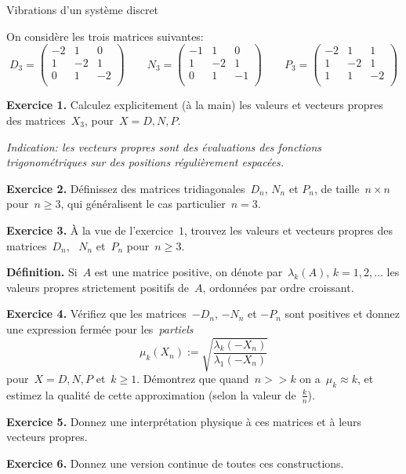 \documentclass[a4paper,11pt]{article}
\begin{document}
\thispagestyle{empty}

\begin{center}
	\Large Vibrations d'un système discret
\end{center}

On considère les trois matrices suivantes:
\[
	D_3=\begin{pmatrix}
		-2 & 1 & 0 \\
		1 & -2 & 1 \\
		0 & 1 & -2 \\
	\end{pmatrix}
	\qquad
	N_3=\begin{pmatrix}
		-1 & 1 & 0 \\
		1 & -2 & 1 \\
		0 & 1 & -1 \\
	\end{pmatrix}
	\qquad
	P_3=\begin{pmatrix}
		-2 & 1 & 1 \\
		1 & -2 & 1 \\
		1 & 1 & -2 \\
	\end{pmatrix}
\]

{\bf Exercice 1.}
Calculez explicitement (à la main) les valeurs et vecteurs propres des
matrices~$X_3$, pour~$X=D,N,P$.

{\sl Indication: les vecteurs propres sont des évaluations des fonctions
trigonométriques sur des positions régulièrement espacées.}

{\bf Exercice 2.}
Définissez des matrices tridiagonales~$D_n$, $N_n$ et $P_n$, de taille~$n\times
n$ pour~$n\ge 3$, qui généralisent le cas particulier~$n=3$.

{\bf Exercice 3.}
À la vue de l'exercice~$1$, trouvez les valeurs et vecteurs propres des
matrices~$D_n$, ~$N_n$ et~$P_n$ pour~$n\ge 3$.

{\bf Définition.}
Si~$A$ est une matrice positive, on dénote par~$\lambda_k(A)$, $k=1,2,\ldots$
les valeurs propres strictement positifs de~$A$, ordonnées par ordre croissant.

{\bf Exercice 4.}
Vérifiez que les matrices~$-D_n$, $-N_n$ et $-P_n$ sont positives et donnez une
expression fermée pour les~\emph{partiels}
\[
	\mu_k(X_n) := \sqrt{\frac{\lambda_k(-X_n)}{\lambda_1(-X_n)}}
\]
pour~$X=D,N,P$ et~$k\ge 1$.  Démontrez que quand~$n>>k$ on a~$\mu_k\approx k$,
et estimez la qualité de cette approximation (selon la valeur de~$\tfrac kn$).

{\bf Exercice 5.}
Donnez une interprétation physique à ces matrices et à leurs vecteurs propres.

{\bf Exercice 6.}
Donnez une version continue de toutes ces constructions.
\end{document}
